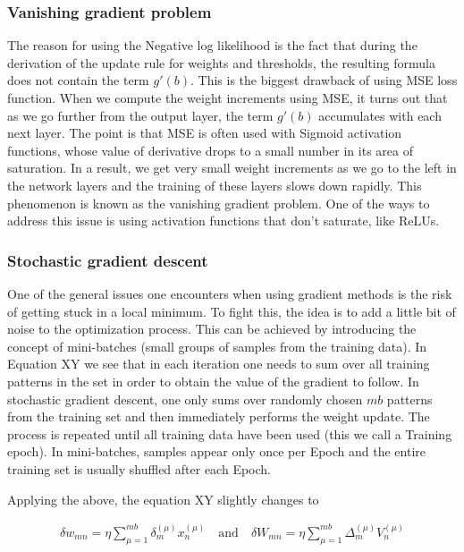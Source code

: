 \subsubsection{Vanishing gradient problem}

The reason for using the Negative log likelihood is the fact that during the derivation of the update rule for weights and thresholds, the resulting formula does not contain the term $ g'(b) $. This is the biggest drawback of using MSE loss function. When we compute the weight increments using MSE, it turns out that as we go further from the output layer, the term $ g'(b) $ accumulates with each next layer. The point is that MSE is often used with Sigmoid activation functions, whose value of derivative drops to a small number in its area of saturation. In a result, we get very small weight increments as we go to the left in the network layers and the training of these layers slows down rapidly. This phenomenon is known as the vanishing gradient problem. One of the ways to address this issue is using activation functions that don't saturate, like ReLUs.

\subsubsection{Stochastic gradient descent}

One of the general issues one encounters when using gradient methods is the risk of getting stuck in a local minimum. To fight this, the idea is to add a little bit of noise to the optimization process. This can be achieved by introducing the concept of mini-batches (small groups of samples from the training data). In Equation XY we see that in each iteration one needs to sum over all training patterns in the set in order to obtain the value of the gradient to follow. In stochastic gradient descent, one only sums over randomly chosen $ mb $ patterns from the training set and then immediately performs the weight update. The process is repeated until all training data have been used (this we call a Training epoch). In mini-batches, samples appear only once per Epoch and the entire training set is usually shuffled after each Epoch.

Applying the above, the equation XY slightly changes to

\begin{gather}
\delta w_{mn} = \eta \sum\limits_{\mu=1}^{mb} \delta_{m}^{(\mu)} x_{n}^{(\mu)}
\quad \text{and} \quad 
\delta W_{mn} = \eta \sum\limits_{\mu=1}^{mb} \Delta_{m}^{(\mu)} V_{n}^{(\mu)}	
\end{gather}

